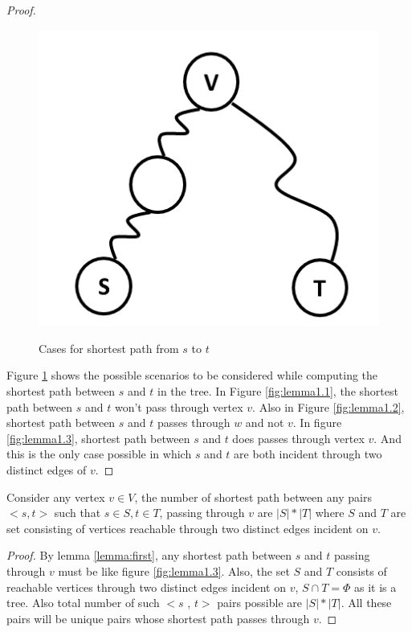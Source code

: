 \begin{proof}
\begin{figure}
{        \includegraphics[scale=0.40]{images/Slide11.PNG}
        \label{fig:lemma1.3}
}
\caption{Cases for shortest path from $s$ to $t$ }
\label{fig:lemma1eg}
\end{figure}

Figure \ref{fig:lemma1eg} shows the possible scenarios to be considered while computing the shortest path between $s$ and $t$ in the tree. In Figure \ref{fig:lemma1.1}, the shortest path between $s$ and $t$ won't pass through vertex $v$. Also in Figure \ref{fig:lemma1.2}, shortest path between $s$ and $t$ passes through $w$ and not $v$. In figure \ref{fig:lemma1.3}, shortest path between $s$ and $t$ does passes through vertex $v$. And this is the only case possible in which $s$ and $t$ are both incident through two distinct edges of $v$.

\end{proof}

\begin{lemma}
\label{lemma:second}
Consider any vertex $v \in V$, the number of shortest path between any pairs $< s, t >$ such that $s \in S, t \in T$, passing through $v$ are $|S| * |T|$ where $S$ and $T$ are set consisting of  vertices reachable through two distinct edges incident on $v$. 
\end{lemma}

\begin{proof}
By lemma \ref{lemma:first}, any shortest path between $s$ and $t$ passing through $v$ must be like figure \ref{fig:lemma1.3}.
Also, the set $S$ and $T$ consists of reachable vertices through two distinct edges incident on $v$, $S \cap T = \Phi$ as it is a tree.  Also total number of such $<s$ , $t>$ pairs possible are $|S| * |T|$. All these pairs will be unique pairs whose shortest path passes through $v$.
\end{proof}

